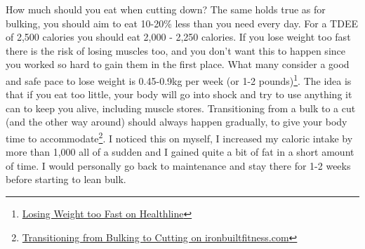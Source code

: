 \documentclass[openany, 12pt]{book}
\begin{document}
	How much should you eat when cutting down? The same holds true as for bulking, you should aim to eat 10-20\% less than you need every day. For a TDEE of 2,500 calories you should eat 2,000 - 2,250 calories.
	If you lose weight too fast there is the risk of losing muscles too, and you don't want this to happen since you worked so hard to gain them in the first place. 
	What many consider a good and safe pace to lose weight is 0.45-0.9kg per week (or 1-2 pounds)\footnote{\href{https://www.healthline.com/nutrition/losing-weight-too-fast}{Losing Weight too Fast on Healthline}}. The idea is that if you eat too little, your body will go into shock and try to use anything it can to keep you alive, including
	muscle stores. Transitioning from a bulk to a cut (and the other way around) should always happen gradually, to give your body time to accommodate\footnote{\href{https://www.ironbuiltfitness.com/transition-from-cutting-to-bulking}{Transitioning from Bulking to Cutting on ironbuiltfitness.com}}. 
	I noticed this on myself, I increased my caloric intake by more than 1,000 all of a sudden and I gained quite a bit of fat in a short amount of time. I would
	personally go back to maintenance and stay there for 1-2 weeks before starting to lean bulk.
	
\end{document}

